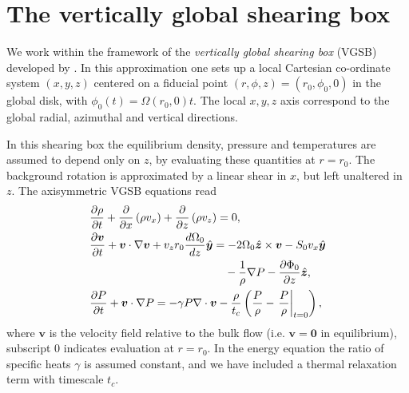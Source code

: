  
 \section{The vertically global shearing box} 
 We work within the framework of the \emph{vertically global shearing
   box} (VGSB) developed by \cite{mcnally14}. In this approximation
 one sets up a local Cartesian co-ordinate  system $(x,y,z)$ centered
 on a fiducial point $(r,\phi,z)=(r_0,\phi_0,0)$ in the global disk, with $\phi_0(t) =
 \Omega(r_0,0)t$. The local $x,y,z$ axis correspond to the
 global radial, azimuthal and vertical directions.  

 In this shearing box the equilibrium density, pressure and 
 temperatures are assumed to depend only on $z$, by evaluating these
 quantities at $r=r_0$. The background rotation is approximated by a
 linear shear in $x$, but left unaltered in $z$. 
 The axisymmetric VGSB equations read
 \begin{align}
   & \frac{\p\rho}{\p t} + \frac{\p}{\p x}\left(\rho v_x\right) +
   \frac{\p}{\p z}\left(\rho v_z\right)=0,\\
   & \frac{\p\bm{v}}{\p t} + \bm{v}\cdot\nabla\bm{v} +
   v_zr_0\frac{d\Omega_0}{dz} \hat{\bm{y}} = - 
   2\Omega_0\hat{\bm{z}}\times\bm{v} - S_0v_x\hat{\bm{y}} \notag\\ 
   &\phantom{\frac{\p\bm{v}}{\p t} + \bm{v}\cdot\nabla\bm{v} +
   v_zr_0\frac{d\Omega_0}{dz} \hat{\bm{y}}=}-\frac{1}{\rho}\nabla P - \frac{\p\Phi_0}{\p z}\hat{\bm{z}},\\
   & \frac{\p P}{\p t} + \bm{v}\cdot\nabla P = -\gamma P
   \nabla\cdot\bm{v} -
   \frac{\rho}{t_c}\left(\frac{P}{\rho}-\left.\frac{P}{\rho}\right|_{t=0}\right), 
 \end{align}
 where $\bm{v}$ is the velocity field relative to the bulk flow
 (i.e. $\bm{v}=\bm{0}$ in equilibrium),  
 subscript $0$ indicates evaluation at $r=r_0$. In the energy equation
 the ratio of specific heats $\gamma$ is assumed constant, 
 and we have included a thermal relaxation term with timescale $t_c$.  


